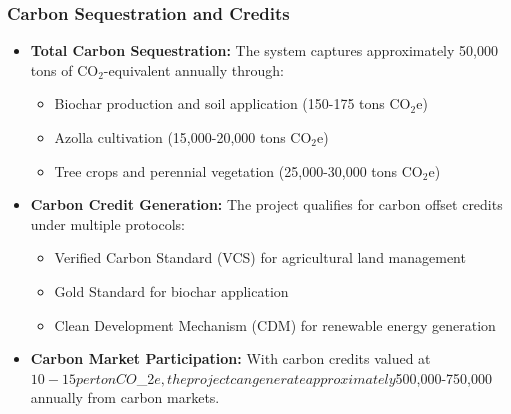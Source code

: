 \subsubsection{Carbon Sequestration and Credits}
\begin{itemize}
    \item \textbf{Total Carbon Sequestration:} The system captures approximately 50,000 tons of CO$_2$-equivalent annually through:
    \begin{itemize}
        \item Biochar production and soil application (150-175 tons CO$_2$e)
        \item Azolla cultivation (15,000-20,000 tons CO$_2$e)
        \item Tree crops and perennial vegetation (25,000-30,000 tons CO$_2$e)
    \end{itemize}
    
    \item \textbf{Carbon Credit Generation:} The project qualifies for carbon offset credits under multiple protocols:
    \begin{itemize}
        \item Verified Carbon Standard (VCS) for agricultural land management
        \item Gold Standard for biochar application
        \item Clean Development Mechanism (CDM) for renewable energy generation
    \end{itemize}
    
    \item \textbf{Carbon Market Participation:} With carbon credits valued at $10-15 per ton CO$_2$e, the project can generate approximately $500,000-750,000 annually from carbon markets.
\end{itemize}

